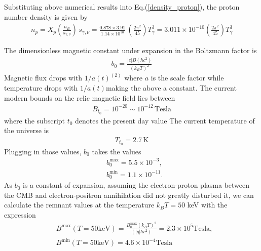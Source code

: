 \documentclass[Universe,article,submit,moreauthors,pdftex]{Definitions/mdpi}
\begin{document}
Substituting above numerical results into Eq.(\ref{density_proton}), the proton number density is given by
\begin{align}
n_p= X_p\left(\frac{n_B}{s_{\gamma,\nu}}\right)\,s_{\gamma,\nu}=\frac{0.878\times3.91}{1.14\times10^{10}}\,\left(\frac{2\pi^2}{45}\right)T_\gamma^3=3.011\times10^{-10}\left(\frac{2\pi^2}{45}\right)T_\gamma^3
\end{align}


The dimensionless magnetic constant under expansion in the Boltzmann factor is
\begin{align}
b_0= \frac{|e|B(\hbar c^2)}{(k_B T)^2}
\end{align}
Magnetic flux drops with $1/a(t)^(2)$ where $a$ is the scale factor while temperature drops with $1/a(t)$making the above a constant. The current modern bounds on the relic magnetic field lies between
\begin{align}
B_{t_0}=10^{-20}\sim10^{-12}\,\mathrm{Tesla}
\end{align}
where the subscript $t_0$ denotes the present day value The current temperature of the universe is 
\begin{align}
T_{t_0}=2.7\,\mathrm{K}
\end{align}
Plugging in those values, $b_0$ takes the values
\begin{align}
&b_0^{\mathrm{max}}= 5.5\times10^{-3},\\
&b_0 ^{\mathrm{min}}= 1.1\times10^{-11}.
\end{align}
As $b_0$ is a constant of expansion, assuming the electron-proton plasma between the CMB and electron-positron annihilation did not greatly disturbed it, we can calculate the remnant values at the temperature $k_BT=50$ keV with the expression
\begin{align}
&B^{\mathrm{max}}(T=50 \mathrm{keV}) = \frac{B^{\mathrm{max}}_0(k_B T)^2}{(|q|\hbar c^2)}= 2.3\times10^5 \mathrm{Tesla},\\
&B^{\mathrm{min}}(T=50 \mathrm{keV})= 4.6\times10^{-4} \mathrm{Tesla}
\end{align}



\end{document}
